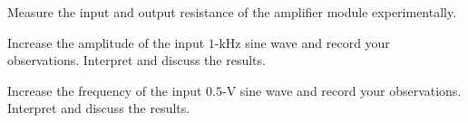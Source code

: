 \documentclass[11pt]{article}
\begin{document}
\begin{question}
    \begin{subquestion}{Measure the input and output resistance of the amplifier module experimentally.}
        \answer{}
    \end{subquestion}

    \begin{subquestion}{Increase the amplitude of the input $1$-kHz sine wave and record your observations. Interpret and discuss the results.}
        \answer{}
    \end{subquestion}

    \begin{subquestion}{Increase the frequency of the input $0.5$-V sine wave and record your observations. Interpret and discuss the results.}
        \answer{}
    \end{subquestion}

\end{question}

\end{document}
